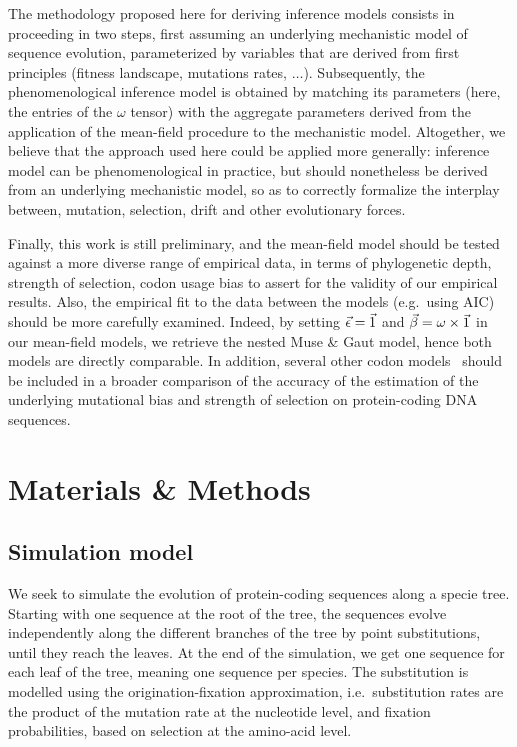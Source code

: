 The methodology proposed here for deriving inference models consists in proceeding in two steps, first assuming an underlying mechanistic model of sequence evolution, parameterized by variables that are derived from first principles (fitness landscape, mutations rates, $\hdots$).
Subsequently, the phenomenological inference model is obtained by matching its parameters (here, the entries of the $\omega$ tensor) with the aggregate parameters derived from the application of the mean-field procedure to the mechanistic model.
Altogether, we believe that the approach used here could be applied more generally: inference model can be phenomenological in practice, but should nonetheless be derived from an underlying mechanistic model, so as to correctly formalize the interplay between, mutation, selection, drift and other evolutionary forces.

Finally, this work is still preliminary, and the mean-field model should be tested against a more diverse range of empirical data, in terms of phylogenetic depth, strength of selection, codon usage bias to assert for the validity of our empirical results.
Also, the empirical fit to the data between the models (e.g.~using AIC) should be more carefully examined.
Indeed, by setting $\vec{\epsilon} = \vec{1}$ and $\vec{\beta} = \omega \times \vec{1}$ in our mean-field models, we retrieve the nested Muse \& Gaut model, hence both models are directly comparable.
In addition, several other codon models~\citep{Rodrigue2008a,KosakovskyPond2020} should be included in a broader comparison of the accuracy of the estimation of the underlying mutational bias and strength of selection on protein-coding DNA sequences.


\section{Materials \& Methods}

\subsection{Simulation model}
\label{sec:mut-bias-simu}
We seek to simulate the evolution of protein-coding sequences along a specie tree.
Starting with one sequence at the root of the tree, the sequences evolve independently along the different branches of the tree by point substitutions, until they reach the leaves.
At the end of the simulation, we get one sequence for each leaf of the tree, meaning one sequence per species.
The substitution is modelled using the origination-fixation approximation, i.e.~substitution rates are the product of the mutation rate at the nucleotide level, and fixation probabilities, based on selection at the amino-acid level.

